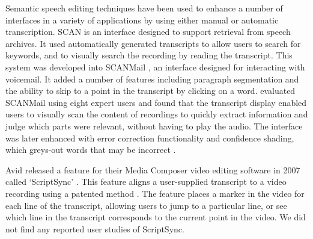 

Semantic speech editing techniques have been used to enhance a number of interfaces in a variety of applications by
using either manual or automatic transcription.
SCAN \citep{Whittaker1999} is an interface designed to support retrieval from speech archives. It used automatically
generated transcripts to allow users to search for keywords, and to visually search the recording by reading the
transcript. This system was developed into SCANMail \citep{Whittaker2002}, an interface designed for interacting with
voicemail. It added a number of features including paragraph segmentation and the ability to skip to a point in the
transcript by clicking on a word. \citet{Whittaker2002} evaluated SCANMail using eight expert users and found that the transcript display
enabled users to visually scan the content of recordings to quickly extract information and judge which parts were
relevant, without having to play the audio.  The interface was later enhanced with error correction functionality and
confidence shading, which greys-out words that may be incorrect \citep{Burke2006}.

Avid released a feature for their Media Composer video editing software in 2007 called `ScriptSync' \citep{Avid2011}.
This feature aligns a user-supplied transcript to a video recording using a patented method \citep{Griggs2007}. The
feature places a marker in the video for each line of the transcript, allowing users to jump to a particular line, or
see which line in the transcript corresponds to the current point in the video.  We did not find any reported user
studies of ScriptSync.


